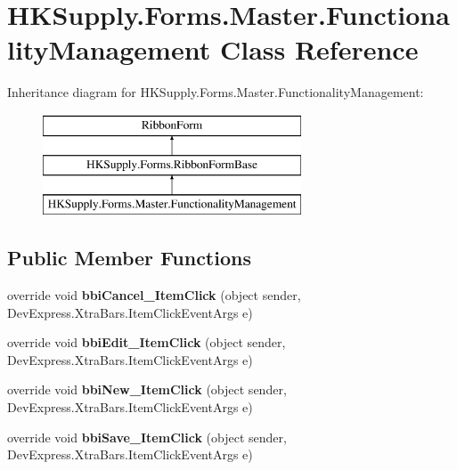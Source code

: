 \hypertarget{class_h_k_supply_1_1_forms_1_1_master_1_1_functionality_management}{}\section{H\+K\+Supply.\+Forms.\+Master.\+Functionality\+Management Class Reference}
\label{class_h_k_supply_1_1_forms_1_1_master_1_1_functionality_management}
Inheritance diagram for H\+K\+Supply.\+Forms.\+Master.\+Functionality\+Management\+:\begin{figure}[H]
\begin{center}
\leavevmode
\includegraphics[height=3.000000cm]{class_h_k_supply_1_1_forms_1_1_master_1_1_functionality_management}
\end{center}
\end{figure}
\subsection*{Public Member Functions}
\begin{DoxyCompactItemize}
\item 
\mbox{\label{class_h_k_supply_1_1_forms_1_1_master_1_1_functionality_management_ae02c244c74378e4e62c66bfcc5d1811c}} 
override void {\bfseries bbi\+Cancel\+\_\+\+Item\+Click} (object sender, Dev\+Express.\+Xtra\+Bars.\+Item\+Click\+Event\+Args e)
\item 
\mbox{\label{class_h_k_supply_1_1_forms_1_1_master_1_1_functionality_management_a00980b4d90d324b378ba405c94daaedc}} 
override void {\bfseries bbi\+Edit\+\_\+\+Item\+Click} (object sender, Dev\+Express.\+Xtra\+Bars.\+Item\+Click\+Event\+Args e)
\item 
\mbox{\label{class_h_k_supply_1_1_forms_1_1_master_1_1_functionality_management_a76ccbf73d6329e2ebf739d68f1b798c7}} 
override void {\bfseries bbi\+New\+\_\+\+Item\+Click} (object sender, Dev\+Express.\+Xtra\+Bars.\+Item\+Click\+Event\+Args e)
\item 
\mbox{\label{class_h_k_supply_1_1_forms_1_1_master_1_1_functionality_management_a5b2e0cfcc822c6c80b84ec5d50c5d235}} 
override void {\bfseries bbi\+Save\+\_\+\+Item\+Click} (object sender, Dev\+Express.\+Xtra\+Bars.\+Item\+Click\+Event\+Args e)
\end{DoxyCompactItemize}
